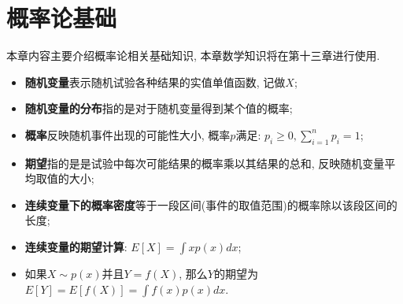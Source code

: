 \chapter{概率论基础}

本章内容主要介绍概率论相关基础知识, 本章数学知识将在第十三章进行使用. 

\begin{itemize}
	\item \textbf{随机变量}表示随机试验各种结果的实值单值函数, 记做$X$; 
	\item \textbf{随机变量的分布}指的是对于随机变量得到某个值的概率; 
	\item \textbf{概率}反映随机事件出现的可能性大小, 概率$p$满足: $p_i\ge 0,\sum_{i=1}^{n}p_i=1$; 
	\item \textbf{期望}指的是是试验中每次可能结果的概率乘以其结果的总和, 反映随机变量平均取值的大小; 
	\item \textbf{连续变量下的概率密度}等于一段区间(事件的取值范围)的概率除以该段区间的长度; 
	\item \textbf{连续变量的期望计算}: $E[X]=\int xp(x)dx$; 
	\item 如果$X\sim p(x)$并且$Y=f(X)$, 那么$Y$的期望为$E[Y]=E[f(X)]=\int f(x)p(x)dx$.
\end{itemize}
